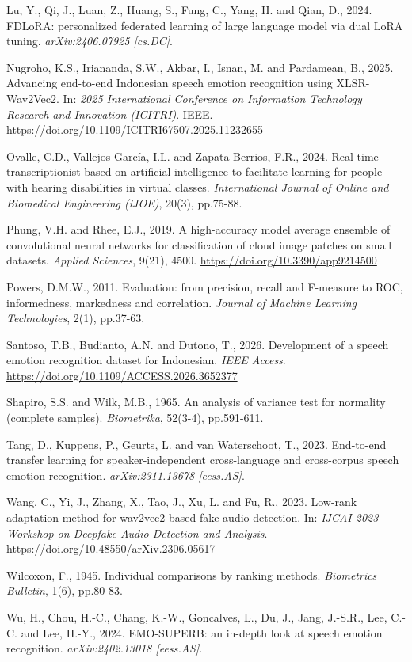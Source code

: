 \noindent
Lu, Y., Qi, J., Luan, Z., Huang, S., Fung, C., Yang, H. and Qian, D.,
2024. FDLoRA: personalized federated learning of large language model
via dual LoRA tuning. \textit{arXiv:2406.07925 [cs.DC]}.

\noindent
Nugroho, K.S., Iriananda, S.W., Akbar, I., Isnan, M. and Pardamean, B.,
2025. Advancing end-to-end Indonesian speech emotion recognition using
XLSR-Wav2Vec2. In: \textit{2025 International Conference on Information
Technology Research and Innovation (ICITRI)}. IEEE.
\url{https://doi.org/10.1109/ICITRI67507.2025.11232655}

\noindent
Ovalle, C.D., Vallejos García, I.L. and Zapata Berrios, F.R., 2024.
Real-time transcriptionist based on artificial intelligence to
facilitate learning for people with hearing disabilities in virtual
classes. \textit{International Journal of Online and Biomedical
Engineering (iJOE)}, 20(3), pp.75-88.

\noindent
Phung, V.H. and Rhee, E.J., 2019. A high-accuracy model average ensemble
of convolutional neural networks for classification of cloud image
patches on small datasets. \textit{Applied Sciences}, 9(21), 4500.
\url{https://doi.org/10.3390/app9214500}

\noindent
Powers, D.M.W., 2011. Evaluation: from precision, recall and F-measure to
ROC, informedness, markedness and correlation. \textit{Journal of
Machine Learning Technologies}, 2(1), pp.37-63.

\noindent
Santoso, T.B., Budianto, A.N. and Dutono, T., 2026. Development of a
speech emotion recognition dataset for Indonesian. \textit{IEEE
Access}. \url{https://doi.org/10.1109/ACCESS.2026.3652377}

\noindent
Shapiro, S.S. and Wilk, M.B., 1965. An analysis of variance test for
normality (complete samples). \textit{Biometrika}, 52(3-4), pp.591-611.

\noindent
Tang, D., Kuppens, P., Geurts, L. and van Waterschoot, T., 2023.
End-to-end transfer learning for speaker-independent cross-language and
cross-corpus speech emotion recognition. \textit{arXiv:2311.13678
[eess.AS]}.

\noindent
Wang, C., Yi, J., Zhang, X., Tao, J., Xu, L. and Fu, R., 2023. Low-rank
adaptation method for wav2vec2-based fake audio detection. In:
\textit{IJCAI 2023 Workshop on Deepfake Audio Detection and Analysis}.
\url{https://doi.org/10.48550/arXiv.2306.05617}

\noindent
Wilcoxon, F., 1945. Individual comparisons by ranking methods.
\textit{Biometrics Bulletin}, 1(6), pp.80-83.

\noindent
Wu, H., Chou, H.-C., Chang, K.-W., Goncalves, L., Du, J., Jang, J.-S.R.,
Lee, C.-C. and Lee, H.-Y., 2024. EMO-SUPERB: an in-depth look at speech
emotion recognition. \textit{arXiv:2402.13018 [eess.AS]}.

\endgroup
